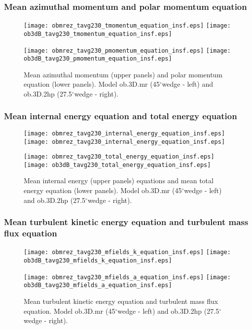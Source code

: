 \documentclass[10pt,paper=a4]{report}
\newcommand{\dgr}{\mbox{$^\circ$}}           %
\begin{document}
\newpage

\subsubsection{Mean azimuthal momentum and polar momentum equation}

\begin{figure}[!h]
\centerline{
\texttt{[image: obmrez\_tavg230\_tmomentum\_equation\_insf.eps]}
\texttt{[image: ob3dB\_tavg230\_tmomentum\_equation\_insf.eps]}}

\centerline{
\texttt{[image: obmrez\_tavg230\_pmomentum\_equation\_insf.eps]}
\texttt{[image: ob3dB\_tavg230\_pmomentum\_equation\_insf.eps]}}
\caption{Mean azimuthal momentum (upper panels) and polar momentum equation (lower panels). Model {\sf ob.3D.mr} (45\dgr wedge - left) and {\sf ob.3D.2hp} (27.5\dgr wedge - right). \label{fig:ob-wedge-pmomentum-tmomentum-equation-eq}}
\end{figure}

\newpage

\subsubsection{Mean internal energy equation and total energy equation}

\begin{figure}[!h]
\centerline{
\texttt{[image: obmrez\_tavg230\_internal\_energy\_equation\_insf.eps]}
\texttt{[image: obmrez\_tavg230\_internal\_energy\_equation\_insf.eps]}}

\centerline{
\texttt{[image: obmrez\_tavg230\_total\_energy\_equation\_insf.eps]}
\texttt{[image: ob3dB\_tavg230\_total\_energy\_equation\_insf.eps]}}
\caption{Mean internal energy (upper panels) equations and mean total energy equation (lower panels). Model {\sf ob.3D.mr} (45\dgr wedge - left) and {\sf ob.3D.2hp} (27.5\dgr wedge - right). \label{fig:obwedge-ei-et-eq}}
\end{figure}

\newpage

\subsubsection{Mean turbulent kinetic energy equation and turbulent mass flux equation}

\begin{figure}[!h]
\centerline{
\texttt{[image: obmrez\_tavg230\_mfields\_k\_equation\_insf.eps]}
\texttt{[image: ob3dB\_tavg230\_mfields\_k\_equation\_insf.eps]}}

\centerline{
\texttt{[image: obmrez\_tavg230\_mfields\_a\_equation\_insf.eps]}
\texttt{[image: ob3dB\_tavg230\_mfields\_a\_equation\_insf.eps]}}
\caption{Mean turbulent kinetic energy equation and turbulent mass flux equation. Model {\sf ob.3D.mr} (45\dgr wedge - left) and {\sf ob.3D.2hp} (27.5\dgr wedge - right). \label{fig:ob-wedge-k-a-eq}}
\end{figure}
\end{document}
